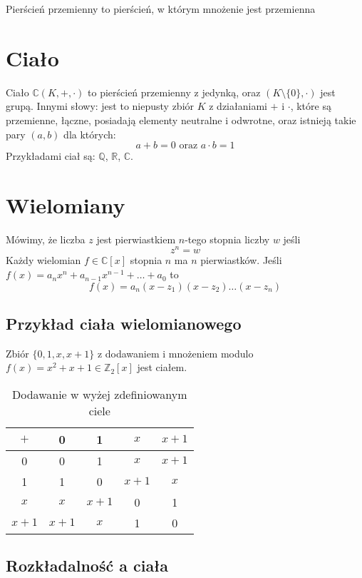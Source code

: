 \documentclass{../notatki}
\begin{document}
Pierścień przemienny to pierścień, w którym mnożenie jest przemienna

\section{Ciało}

Ciało $\mathbb{C}(K, +, \cdot)$ to pierścień przemienny z jedynką, oraz $(K
\setminus \{0\}, \cdot)$ jest grupą.
Innymi słowy: jest to niepusty zbiór $K$ z działaniami $+$ i $\cdot$, które
są przemienne, łączne, posiadają elementy neutralne i odwrotne, oraz
istnieją takie pary $(a, b)$ dla których:
$$
a + b = 0 \text{ oraz } a \cdot b = 1
$$
Przykładami ciał są: $\mathbb{Q}$, $\mathbb{R}$, $\mathbb{C}$.

\section{Wielomiany}

Mówimy, że liczba $z$ jest pierwiastkiem $n$-tego stopnia liczby $w$ jeśli
$$
z^n = w
$$
Każdy wielomian $f \in \mathbb{C}[x]$ stopnia $n$ ma $n$
pierwiastków. Jeśli $f(x) = a_n x^n + a_{n-1} x^{n-1} + \dots + a_0$ to
$$
f(x) = a_n (x - z_1)(x - z_2) \dots (x - z_n)
$$

\subsection{Przykład ciała wielomianowego}

Zbiór $\{0, 1, x, x+1\}$ z dodawaniem i mnożeniem modulo $f(x) = x^2
+ x + 1 \in \mathbb{Z}_2[x]$ jest ciałem.

\begin{table*}[h]
  \centering
  \begin{tabular}{c|cccc}
    \hline
    $+$ & 0 & 1 & $x$ & $x + 1$ \\
    \hline
    0 & 0 & 1 & $x$ & $x + 1$ \\
    1 & 1 & 0 & $x + 1$ & $x$ \\
    $x$ & $x$ & $x + 1$ & 0 & 1 \\
    $x + 1$ & $x + 1$ & $x$ & 1 & 0 \\
    \hline
  \end{tabular}
  \caption{Dodawanie w wyżej zdefiniowanym ciele}
\end{table*}

\subsection{Rozkładalność a ciała}
\end{document}
